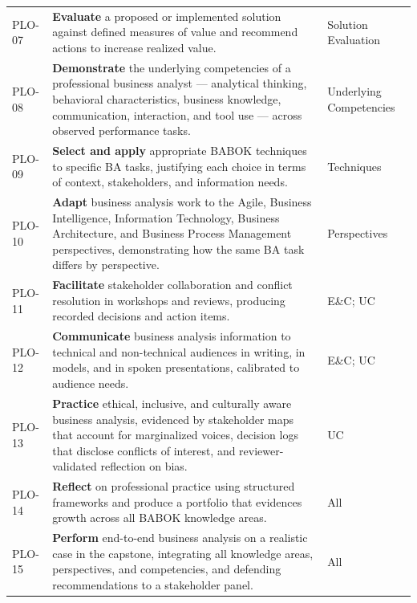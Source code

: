 \documentclass[11pt,letterpaper,oneside]{report}
\begin{document}
\begin{longtable}{@{}R{0.85cm} R{10.40cm} R{3.05cm}@{}}
PLO-07 & \textbf{Evaluate} a proposed or implemented solution against defined measures of value and recommend actions to increase realized value. & Solution Evaluation \\

PLO-08 & \textbf{Demonstrate} the underlying competencies of a professional business analyst --- analytical thinking, behavioral characteristics, business knowledge, communication, interaction, and tool use --- across observed performance tasks. & Underlying Competencies \\

PLO-09 & \textbf{Select and apply} appropriate BABOK techniques to specific BA tasks, justifying each choice in terms of context, stakeholders, and information needs. & Techniques \\

PLO-10 & \textbf{Adapt} business analysis work to the Agile, Business Intelligence, Information Technology, Business Architecture, and Business Process Management perspectives, demonstrating how the same BA task differs by perspective. & Perspectives \\

PLO-11 & \textbf{Facilitate} stakeholder collaboration and conflict resolution in workshops and reviews, producing recorded decisions and action items. & E\&C; UC \\

PLO-12 & \textbf{Communicate} business analysis information to technical and non-technical audiences in writing, in models, and in spoken presentations, calibrated to audience needs. & E\&C; UC \\

PLO-13 & \textbf{Practice} ethical, inclusive, and culturally aware business analysis, evidenced by stakeholder maps that account for marginalized voices, decision logs that disclose conflicts of interest, and reviewer-validated reflection on bias. & UC \\

PLO-14 & \textbf{Reflect} on professional practice using structured frameworks and produce a portfolio that evidences growth across all BABOK knowledge areas. & All \\

PLO-15 & \textbf{Perform} end-to-end business analysis on a realistic case in the capstone, integrating all knowledge areas, perspectives, and competencies, and defending recommendations to a stakeholder panel. & All \\

\end{longtable}
\end{document}
